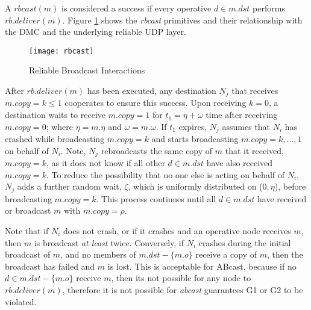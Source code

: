      A $rbcast(m)$ is considered a success if every operative $d \in m.dst$ performs $rb.deliver(m)$.  Figure \ref{fig:rbcast} shows the \emph{rbcast} primitives and their relationship with the DMC and the underlying reliable UDP layer.  
    
    \begin{figure}[!h] 
        \centering    
         \texttt{[image: rbcast]}
         \caption[Reliable Broadcast Interactions]{Reliable Broadcast Interactions}
         \label{fig:rbcast}
    \end{figure}
    
    After $rb.deliver(m)$ has been executed, any destination $N_j$ that receives $m.copy = k \leq 1$ cooperates to ensure this success.  Upon receiving $k = 0$, a destination waits to receive $m.copy = 1$ for ${t_1 = \eta + \omega}$ time after receiving $m.copy = 0$; where $\eta= m.\eta$ and $\omega=m.\omega$.  If $t_1$ expires, $N_j$ assumes that $N_i$ has crashed while broadcasting $m.copy = k$ and starts broadcasting $m.copy = k, \ldots, 1$ on behalf of $N_i$. Note, $N_j$ rebroadcasts the same copy of $m$ that it received, $m.copy = k$, as it does not know if all other $d \in m.dst$ have also received $m.copy = k$.  To reduce the possibility that no one else is acting on behalf of $N_i$, $N_j$ adds a further random wait, $\zeta$, which is uniformly distributed on ($0,\eta$), before broadcasting $m.copy = k$.  This process continues until all $d \in m.dst$ have received or broadcast $m$ with $m.copy = \rho$.  
    
    Note that if $N_i$ does not crash, or if it crashes and an operative node receives $m$, then $m$ is broadcast \emph{at least} twice.  Conversely, if $N_i$ crashes during the initial broadcast of $m$, and no members of $m.dst - \{m.o\}$ receive a copy of $m$, then the broadcast has failed and $m$ is lost.  This is acceptable for \textsf{ABcast}, because if no $d \in m.dst - \{m.o\}$ receive $m$, then its not possible for any node to $rb.deliver(m)$, therefore it is not possible for \emph{abcast} guarantees G1 or G2 to be violated.  
    
    
